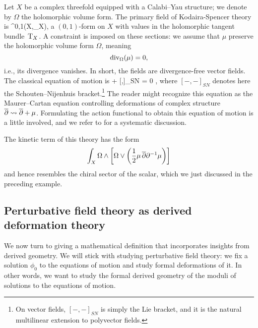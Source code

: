 \documentclass[11pt]{amsart}
\def\del{\partial}
\begin{document}
Let $X$ be a complex threefold equipped with a Calabi--Yau structure; we denote by $\Omega$ the holomorphic volume form.
The primary field of Kodaira-Spencer theory is 
\beqn
\mu \in \Omega^{0,1}(X,\T_X),
\eeqn 
a $(0,1)$-form  on $X$ with values in the holomorphic tangent bundle~${\rm T}_X$.
A constraint is imposed on these sections:
we assume that $\mu$ preserve the holomorphic volume form $\Omega$, meaning 
\[
{\rm div}_\Omega(\mu) = 0,
\]
i.e., its divergence vanishes.
In short, the fields are divergence-free vector fields.
The classical equation of motion is 
\beqn
\dbar \mu +  [\mu,\mu]_{SN} = 0 ,
\eeqn
where $[-,-]_{SN}$ denotes here the Schouten--Nijenhuis bracket.\footnote{On vector fields, $[-,-]_{SN}$ is simply the Lie bracket, and it is the natural multilinear extension to polyvector fields.}
The reader might recognize this equation as the Maurer--Cartan equation controlling deformations of complex structure ${\overline{\partial}}\rightsquigarrow {\overline{\partial}} + \mu$.
Formulating the action functional to obtain this equation of motion is a little involved, 
and we refer to \cite{CLbcov1} for a systematic discussion.

\begin{rmk}
The kinetic term of this theory has the form
\[
\int_X \Omega \wedge \left[\Omega \vee \left(\frac12 \mu\, \dbar \del^{-1} \mu\right) \right]
\]
and hence resembles the chiral sector of the scalar, which we just discussed in the preceding example.
\end{rmk}

\subsection{Perturbative field theory as derived deformation theory}
\label{sec: pert dfn}

We now turn to giving a mathematical definition that incorporates insights from derived geometry.
We will stick with studying perturbative field theory: 
we fix a solution $\phi_0$ to the equations of motion and study formal deformations of it.
In other words, we want to study the formal derived geometry of the moduli of solutions to the equations of motion.
\end{document}
